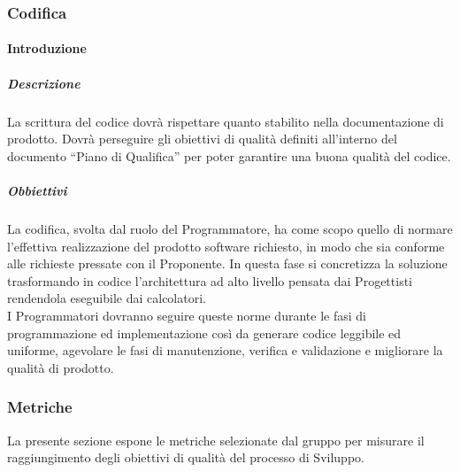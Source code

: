 		\subsubsection{Codifica}
			\paragraph{Introduzione}
				\subparagraph{Descrizione}
					La scrittura del codice dovrà rispettare quanto stabilito nella documentazione di prodotto. Dovrà perseguire gli obiettivi di qualità definiti all'interno del documento “Piano di Qualifica” per poter garantire una buona qualità del codice.\\
				\subparagraph{Obbiettivi}
					La codifica, svolta dal ruolo del Programmatore, ha come scopo quello di normare l’effettiva realizzazione del prodotto software richiesto, in modo che sia conforme alle richieste pressate con il Proponente. In questa fase si concretizza la soluzione trasformando in codice l’architettura ad alto livello pensata dai Progettisti rendendola eseguibile dai calcolatori.\\
					I Programmatori dovranno seguire queste norme durante le fasi di programmazione ed implementazione così da generare codice leggibile ed uniforme, agevolare le fasi di manutenzione, verifica e validazione e migliorare la qualità di prodotto.\\	

		\subsubsection{Metriche}
			La presente sezione espone le metriche selezionate dal gruppo per misurare il raggiungimento degli obiettivi di qualità del processo di Sviluppo. \\
